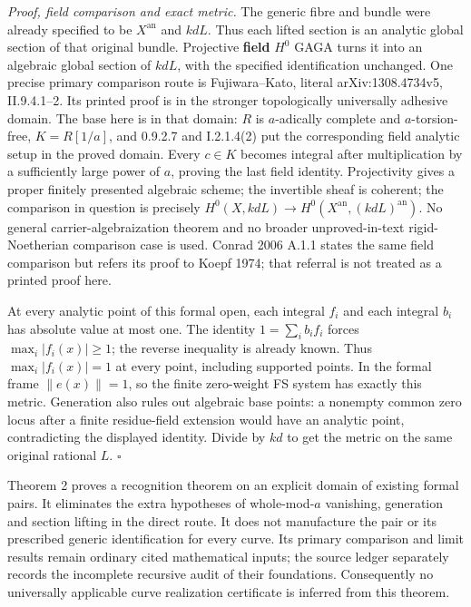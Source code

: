 \documentclass[
  11pt,
]{article}
\begin{document}
\emph{Proof, field comparison and exact metric.} The generic fibre and
bundle were already specified to be \(X^{\mathrm{an}}\) and \(kdL\).
Thus each lifted section is an analytic global section of that original
bundle. Projective \textbf{field} \(H^0\) GAGA turns it into an
algebraic global section of \(kdL\), with the specified identification
unchanged. One precise primary comparison route is Fujiwara--Kato,
literal arXiv:1308.4734v5, II.9.4.1--2. Its printed proof is in the
stronger topologically universally adhesive domain. The base here is in
that domain: \(R\) is \(a\)-adically complete and \(a\)-torsion-free,
\(K=R[1/a]\), and 0.9.2.7 and I.2.1.4(2) put the corresponding field
analytic setup in the proved domain. Every \(c\in K\) becomes integral
after multiplication by a sufficiently large power of \(a\), proving the
last field identity. Projectivity gives a proper finitely presented
algebraic scheme; the invertible sheaf is coherent; the comparison in
question is precisely
\(H^0(X,kdL)\to H^0(X^{\mathrm{an}},(kdL)^{\mathrm{an}})\). No general
carrier-algebraization theorem and no broader unproved-in-text
rigid-Noetherian comparison case is used. Conrad 2006 A.1.1 states the
same field comparison but refers its proof to Koepf 1974; that referral
is not treated as a printed proof here.

At every analytic point of this formal open, each integral \(f_i\) and
each integral \(b_i\) has absolute value at most one. The identity
\(1=\sum_i b_i f_i\) forces \(\max_i|f_i(x)|\geq1\); the reverse
inequality is already known. Thus \(\max_i|f_i(x)|=1\) at every point,
including supported points. In the formal frame \(\|e(x)\|=1\), so the
finite zero-weight FS system has exactly this metric. Generation also
rules out algebraic base points: a nonempty common zero locus after a
finite residue-field extension would have an analytic point,
contradicting the displayed identity. Divide by \(kd\) to get the metric
on the same original rational \(L\). \(\square\)

Theorem 2 proves a recognition theorem on an explicit domain of existing
formal pairs. It eliminates the extra hypotheses of whole-mod-\(a\)
vanishing, generation and section lifting in the direct route. It does
not manufacture the pair or its prescribed generic identification for
every curve. Its primary comparison and limit results remain ordinary
cited mathematical inputs; the source ledger separately records the
incomplete recursive audit of their foundations. Consequently no
universally applicable curve realization certificate is inferred from
this theorem.
\end{document}
